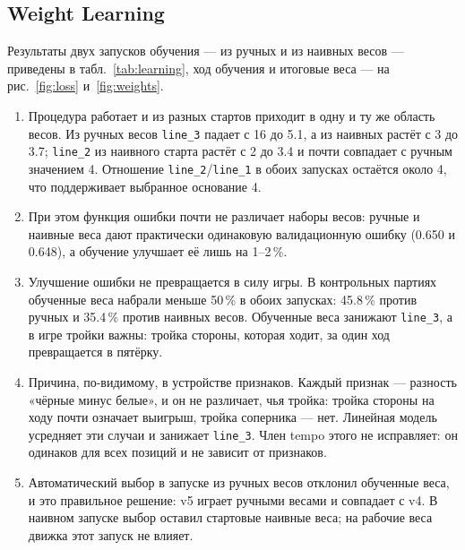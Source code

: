 \documentclass[a4paper,10pt,twocolumn]{article}
\newenvironment{points}{\begin{enumerate}[label=(\arabic*),leftmargin=*,itemsep=2pt,topsep=3pt]}{\end{enumerate}}
\newcommand{\code}[1]{\texttt{#1}}
\begin{document}
\subsection{Weight Learning}\label{sec:learning-results}
Результаты двух запусков обучения --- из ручных и из наивных весов --- приведены в табл.~\ref{tab:learning}, ход обучения и итоговые веса --- на рис.~\ref{fig:loss} и~\ref{fig:weights}.
\begin{points}
\item Процедура работает и из разных стартов приходит в одну и ту же область весов. Из ручных весов \code{line\_3} падает с 16 до 5.1, а из наивных растёт с 3 до 3.7; \code{line\_2} из наивного старта растёт с 2 до 3.4 и почти совпадает с ручным значением 4. Отношение \code{line\_2}/\code{line\_1} в обоих запусках остаётся около 4, что поддерживает выбранное основание 4.
\item При этом функция ошибки почти не различает наборы весов: ручные и наивные веса дают практически одинаковую валидационную ошибку (0.650 и 0.648), а обучение улучшает её лишь на 1--2\,\%.
\item Улучшение ошибки не превращается в силу игры. В контрольных партиях обученные веса набрали меньше 50\,\% в обоих запусках: 45.8\,\% против ручных и 35.4\,\% против наивных весов. Обученные веса занижают \code{line\_3}, а в игре тройки важны: тройка стороны, которая ходит, за один ход превращается в пятёрку.
\item Причина, по-видимому, в устройстве признаков. Каждый признак --- разность «чёрные минус белые», и он не различает, чья тройка: тройка стороны на ходу почти означает выигрыш, тройка соперника --- нет. Линейная модель усредняет эти случаи и занижает \code{line\_3}. Член tempo этого не исправляет: он одинаков для всех позиций и не зависит от признаков.
\item Автоматический выбор в запуске из ручных весов отклонил обученные веса, и это правильное решение: v5 играет ручными весами и совпадает с v4. В наивном запуске выбор оставил стартовые наивные веса; на рабочие веса движка этот запуск не влияет.
\end{points}
\end{document}

